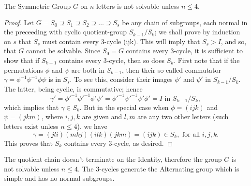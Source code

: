 \begin{theorem}
The Symmetric Group $G$ on  $n$ letters is not solvable unless $n\le 4$.
\end{theorem}

\begin{proof}
Let $G = S_0 \supseteq S_1 \supseteq S_2 \supseteq \hdots \supseteq S_s$ be any chain of subgroups, each normal in the preceeding with cyclic quotient-group
$S_{k-1}/S_k$; we shall prove by induction on $s$ that $S_s$ must contain every 3-cycle (ijk). This will imply that $S_s > I$, and so, that $G$ cannot be solvable. 
Since $S_0 = G$ contains every 3-cycle, it is sufficient to show that if $S_{k-1}$ contains every 3-cycle, then so does $S_k$. First note that if the permutations $\phi$ and $\psi$ are both in $S_{k-1}$, 
then their so-called commutator $\gamma = \phi^{-1}\psi^{-1}\phi\psi$ is in $S_s$. To see this, consider their images $\phi'$ and $\psi'$ in $S_{k-1}/S_k$. The latter, being cyclic, is commutative; hence
\[ \gamma' = \phi'^{-1} \psi'^{-1} \phi' \psi' = \phi'^{-1} \psi'^{-1} \psi' \phi'  = I  \mbox{  in  } S_{k-1}/S_k,\] which implies that $\gamma \in S_k$. But in the special case when $\phi = (ijk)$ and $\psi = (jkm)$, where 
$i, j, k$ are given and $l, m$ are any two other letters (such letters exist unless $n\le 4$), we have 
\[ \gamma = (jli) (mkj) (ilk) (jkm) = (ijk) \in S_k, \mbox{ for all  }  i, j, k.\]
This proves that $S_k$ contains every 3-cycle, as desired. 
\end{proof}

The quotient chain doesn't terminate on the Identity, therefore the group $G$ is not solvable unless $n\le 4$. The 3-cycles generate the Alternating group which is simple and has no normal subgroups. 
